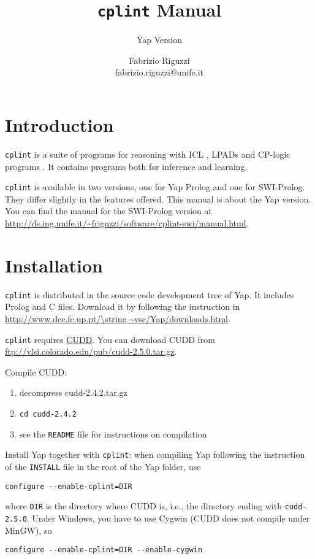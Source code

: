 \documentclass[a4paper,10pt]{scrartcl}
\begin{document}
\title{\texttt{cplint} Manual}

\subtitle{Yap Version}

\author{Fabrizio Riguzzi\\
fabrizio.riguzzi@unife.it}

\maketitle


\section{Introduction}


\texttt{cplint} is a suite of programs for reasoning with ICL \cite{DBLP:journals/ai/Poole97}, LPADs \cite{VenVer03-TR,VenVer04-ICLP04-IC} and CP-logic programs \cite{VenDenBru-JELIA06,DBLP:journals/tplp/VennekensDB09}. It contains programs both for inference and learning.

\texttt{cplint} is available in two versions, one for Yap Prolog and one for SWI-Prolog. They differ slightly in the features offered.
This manual is about the Yap version. You can find the manual for the SWI-Prolog version at \url{http://ds.ing.unife.it/~friguzzi/software/cplint-swi/manual.html}.

\section{Installation}
\texttt{cplint} is distributed in the source code development tree of Yap. It includes Prolog and C files. Download it by following the instruction in \url{http://www.dcc.fc.up.pt/\string ~vsc/Yap/downloads.html}.

\texttt{cplint} requires \href{http://vlsi.colorado.edu/\string ~fabio/CUDD/}{CUDD}.
You can download CUDD from \url{ftp://vlsi.colorado.edu/pub/cudd-2.5.0.tar.gz}.

Compile CUDD:
\begin{enumerate}
\item decompress cudd-2.4.2.tar.gz
\item \texttt{cd cudd-2.4.2}
\item see the \texttt{README} file for instructions on compilation
\end{enumerate}

Install Yap together with \texttt{cplint}:
when compiling Yap following the instruction of the \texttt{INSTALL} file in the root of the Yap folder, use
\begin{verbatim}
configure --enable-cplint=DIR
\end{verbatim}
where \verb|DIR| is the directory where CUDD is, i.e., the directory ending with \texttt{cudd-2.5.0}.
Under Windows, you have to use Cygwin (CUDD does not compile under MinGW), so\\
\begin{verbatim}
configure --enable-cplint=DIR --enable-cygwin
\end{verbatim}
\end{document}
